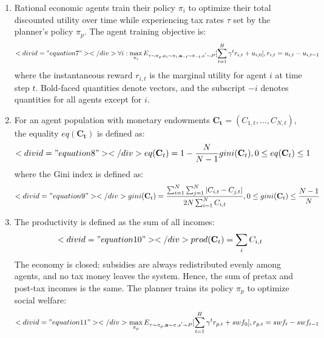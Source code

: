 \documentclass{article}
\begin{document}
\begin{enumerate}
\item Rational economic agents train their policy \( \pi_{i} \) to optimize their total discounted utility over time while experiencing tax rates \( \tau \) set by the planner’s policy \( \pi_{p} \). The agent training objective is:
\begin{equation}<div id="equation7"></div>

\forall i : \max_{\pi_{i}} E_{\tau \sim \pi_{p}, a_{i} \sim \pi_{i}, \mathbf{a_{-i}} \sim \mathbf{\pi_{-i}}, s^{'} \sim P} [\sum^{H}_{t = 1} \gamma^{t} r_{i, t} + u_{i, 0}], r_{i, t} = u_{i, t} - u_{i, t - 1}
\end{equation}
where the instantaneous reward \( r_{i, t} \) is the marginal utility for agent \( i \) at time step \( t \). Bold-faced quantities denote vectors, and the subscript \( -i \) denotes quantities for all agents except for \( i \).

\item For an agent population with monetary endowments \( \mathbf{C_{t}} = (C_{1, t}, ..., C_{N, t}) \), the equality \( eq(\mathbf{C_{t}}) \) is defined as:
\begin{equation}<div id="equation8"></div>

eq(\mathbf{C}_{t}) = 1 - \frac{N}{N - 1} gini(\mathbf{C}_{t}), 0 \leq eq(\mathbf{C}_{t}) \leq 1
\end{equation}
where the Gini index is defined as:
\begin{equation}<div id="equation9"></div>

gini(\mathbf{C}_{t}) = \frac{\sum_{i = 1}^{N} \sum_{j = 1}^{N} |C_{i, t} - C_{j, t}|}{2N \sum^{N}_{i = 1} C_{i, t}}, 0 \leq gini(\mathbf{C}_{t}) \leq \frac{N - 1}{N}
\end{equation}

\item The productivity is defined as the sum of all incomes:
\begin{equation}<div id="equation10"></div>

prod(\mathbf{C}_{t}) = \sum_{i} C_{i, t}
\end{equation}
The economy is closed: subsidies are always redistributed evenly among agents, and no tax money leaves the system. Hence, the sum of pretax and post-tax incomes is the same. The planner trains its policy \( \pi_{p} \) to optimize social welfare:
\begin{equation}<div id="equation11"></div>

\max_{\pi_{p}} E_{\tau \sim \pi_{p}, \mathbf{a} \sim \mathbf{\pi}, s^{'} \sim P} [\sum^{H}_{t = 1} \gamma^{t} r_{p, t} + swf_{0}], r_{p, t} = swf_{t} - swf_{t - 1}
\end{equation}


\end{enumerate}
\end{document}
